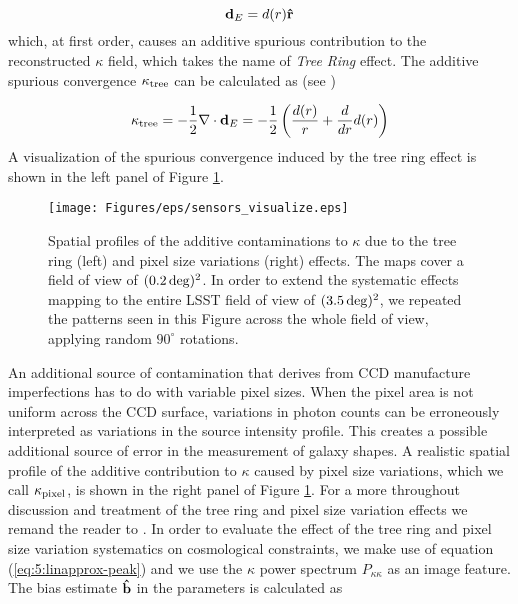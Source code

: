 \begin{equation}
\label{eq:7:displ}
\mathbf{d}_E = d(r)\mathbf{\hat{r}}
\end{equation}
%
which, at first order, causes an additive spurious contribution to the reconstructed $\kappa$ field, which takes the name of \textit{Tree Ring} effect. The additive spurious convergence $\kappa_{\rm tree}$ can be calculated as (see \citep{PetriCCD})

\begin{equation}
\label{eq:7:ktree}
\kappa_{\rm tree} = -\frac{1}{2}\nabla\cdot\mathbf{d}_E = -\frac{1}{2}\left(\frac{d(r)}{r}+\frac{d}{dr}d(r)\right)
\end{equation}   
%
A visualization of the spurious convergence induced by the tree ring effect is shown in the left panel of Figure \ref{fig:7:sensvis}. 
%
\begin{figure}
\begin{center}
\texttt{[image: Figures/eps/sensors\_visualize.eps]}
\end{center}
\caption{Spatial profiles of the additive contaminations to $\kappa$ due to the tree ring (left) and pixel size variations (right) effects. The maps cover a field of view of $(0.2\,{\rm deg})^2$. In order to extend the systematic effects mapping to the entire LSST field of view of $(3.5\,{\rm deg})^2$, we repeated the patterns seen in this Figure across the whole field of view, applying random $90^\circ$ rotations.}
\label{fig:7:sensvis}
\end{figure}
%
An additional source of contamination that derives from CCD manufacture imperfections has to do with variable pixel sizes. When the pixel area is not uniform across the CCD surface, variations in photon counts can be erroneously interpreted as variations in the source intensity profile. This creates a possible additional source of error in the measurement of galaxy shapes. A realistic spatial profile of the additive contribution to $\kappa$ caused by pixel size variations, which we call $\kappa_{\rm pixel}$, is shown in the right panel of Figure \ref{fig:7:sensvis}. For a more throughout discussion and treatment of the tree ring and pixel size variation effects we remand the reader to \citep{PetriCCD}. In order to evaluate the effect of the tree ring and pixel size variation systematics on cosmological constraints, we make use of equation (\ref{eq:5:linapprox-peak}) and we use the $\kappa$ power spectrum $P_{\kappa\kappa}$ as an image feature. The bias estimate $\mathbf{\hat{b}}$ in the parameters is calculated as 

